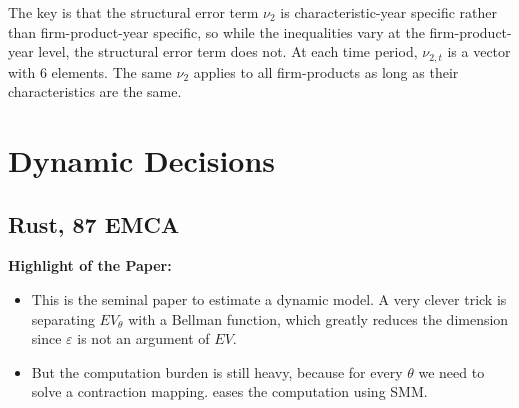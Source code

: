 \documentclass{book}
\theoremstyle{plain}
\theoremstyle{definition}
\begin{document}
The key is that the structural error term $\nu_2$ is characteristic-year specific rather than firm-product-year specific, so while the inequalities vary at the firm-product-year level, the structural error term does not.
At each time period, $\nu_{2,t}$ is a vector with 6 elements. The same $\nu_2$ applies to all firm-products as long as their characteristics are the same.





\chapter{Dynamic Decisions} %
\label{cha:dynamic_decisions}

\section{Rust, 87 EMCA} %
\label{sec:rust_87_emca}

\textbf{}

\vspace{1em}
\noindent
\textbf{Highlight of the Paper:}
\begin{itemize}
	\item This is the seminal paper to estimate a dynamic model.
	A very clever trick is separating $EV_\theta$ with a Bellman function, which greatly reduces the dimension since $\varepsilon$ is not an argument of $EV$.

	\item But the computation burden is still heavy, because for every $\theta$ we need to solve a contraction mapping. \cite{Hotz:1993ea} eases the computation using SMM.
\end{itemize}
\end{document}

